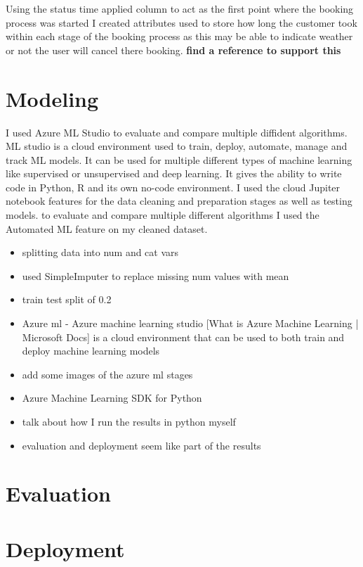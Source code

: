 Using the status time applied column to act as the first point where the booking process was started I created attributes used to store how long the customer took within each stage of the booking process as this may be able to indicate weather or not the user will cancel there booking.  \textbf{find a reference to support this}

\section{Modeling}

I used Azure ML Studio to evaluate and compare multiple diffident algorithms. ML studio is a cloud environment used to train, deploy, automate, manage and track ML models. It can be used for multiple different types of machine learning like supervised or unsupervised and deep learning. It gives the ability to write code in Python, R and its own no-code environment.  I used the cloud Jupiter notebook features for the data cleaning and preparation stages as well as testing models. to evaluate and compare multiple different algorithms I used the Automated ML feature on my cleaned dataset.

\begin{itemize}
\item splitting data into num and cat vars 
\item used SimpleImputer to replace missing num values with mean
\item train test split of 0.2
\item Azure ml - Azure machine learning studio [What is Azure Machine Learning | Microsoft Docs] is a cloud environment that can be used to both train and deploy machine learning models 
\item add some images of the azure ml stages
\item Azure Machine Learning SDK for Python
\item talk about how I run the results in python myself
\end{itemize}




\begin{itemize}
\item evaluation and deployment seem like part of the results
\end{itemize}

\section{Evaluation}

\section{Deployment}


